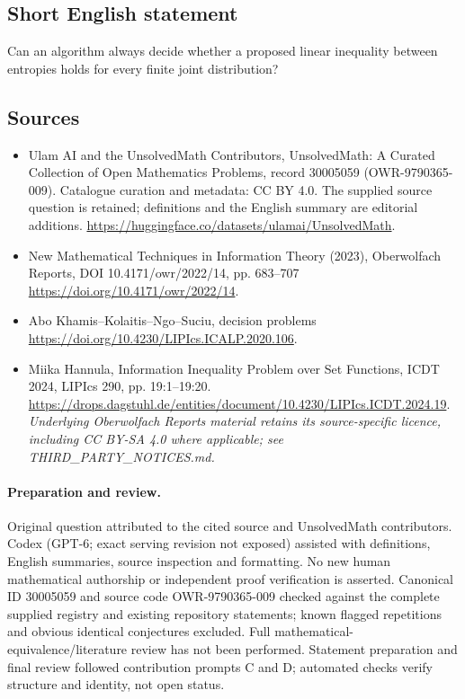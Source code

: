 \documentclass[11pt]{article}
\begin{document}
\subsection{Short English statement}
Can an algorithm always decide whether a proposed linear inequality between entropies holds for every finite joint distribution?
\subsection{Sources}
\begin{itemize}
\item[\hypertarget{source:30005059:1}{S1}] Ulam AI and the UnsolvedMath Contributors, UnsolvedMath: A Curated Collection of Open Mathematics Problems, record 30005059 (OWR-9790365-009). Catalogue curation and metadata: CC BY 4.0. The supplied source question is retained; definitions and the English summary are editorial additions.
\url{https://huggingface.co/datasets/ulamai/UnsolvedMath}.
\item[\hypertarget{source:30005059:2}{S2}] New Mathematical Techniques in Information Theory (2023), Oberwolfach Reports, DOI 10.4171/owr/2022/14, pp. 683--707
\url{https://doi.org/10.4171/owr/2022/14}.
\item[\hypertarget{source:30005059:3}{S3}] Abo Khamis--Kolaitis--Ngo--Suciu, decision problems
\url{https://doi.org/10.4230/LIPIcs.ICALP.2020.106}.
\item[\hypertarget{source:30005059:4}{S4}] Miika Hannula, Information Inequality Problem over Set Functions, ICDT 2024, LIPIcs 290, pp. 19:1--19:20.
\url{https://drops.dagstuhl.de/entities/document/10.4230/LIPIcs.ICDT.2024.19}.
\textit{Underlying Oberwolfach Reports material retains its source-specific licence, including CC BY-SA 4.0 where applicable; see THIRD\_PARTY\_NOTICES.md.}
\end{itemize}
\paragraph{Preparation and review.}
Original question attributed to the cited source and UnsolvedMath contributors. Codex (GPT-6; exact serving revision not exposed) assisted with definitions, English summaries, source inspection and formatting. No new human mathematical authorship or independent proof verification is asserted. Canonical ID 30005059 and source code OWR-9790365-009 checked against the complete supplied registry and existing repository statements; known flagged repetitions and obvious identical conjectures excluded. Full mathematical-equivalence/literature review has not been performed. Statement preparation and final review followed contribution prompts C and D; automated checks verify structure and identity, not open status.
\label{end:30005059}
\end{document}
